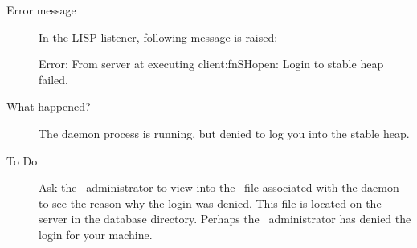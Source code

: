 \begin{description}
\item[Error message]
In the LISP listener, following message is raised:
\begin{CompactCode}
Error: From server at executing client:fnSHopen:
       Login to stable heap failed.
\end{CompactCode}

\item[What happened?] The daemon process is running, but denied to log
  you into the stable heap.
\item[To Do] Ask the \plob\ administrator to view into the
  \ file associated with the daemon to see the
  reason why the login was denied. This file is located on the server
  in the database directory. Perhaps the \plob\ administrator
  has denied the login for your machine.
\end{description}


%

